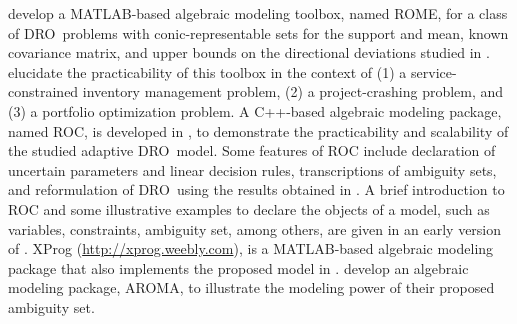 \documentclass[final,onefignum,onetabnum]{class}
\newcommand{\dro}{DRO}
\begin{document}
\citet{goh2011} develop a MATLAB-based algebraic modeling toolbox, named ROME, for a class of \dro\ problems with conic-representable sets for the support and mean, known covariance matrix, and  upper bounds on the directional
deviations  studied in \citet{goh2010tractable}. \citet{goh2011} elucidate the practicability of this toolbox in the context of  (1) a service-constrained
inventory management problem, (2) a project-crashing problem, and (3) a portfolio optimization problem.
A C++-based algebraic modeling package, named ROC,  is developed in \citet{bertsimas2018adaptiveDRO}, to demonstrate the practicability and scalability of the studied  adaptive \dro\ model. Some features of ROC include  declaration of uncertain parameters and linear decision
rules, transcriptions of ambiguity sets, and reformulation of \dro\ using the results obtained in   \citet{bertsimas2018adaptiveDRO}. A brief introduction to ROC and some illustrative examples to declare the objects of a model, such as  variables, constraints, ambiguity set, among others,  are given in an early version of  \citet{bertsimas2014practicable}.
XProg (\url{http://xprog.weebly.com}), is a MATLAB-based algebraic modeling
package that also implements the proposed model in  \citet{bertsimas2018adaptiveDRO}. 
\citet{chen2018adaptive}  develop an algebraic modeling package, AROMA, to  illustrate the modeling power of their proposed ambiguity set. 
\end{document}
